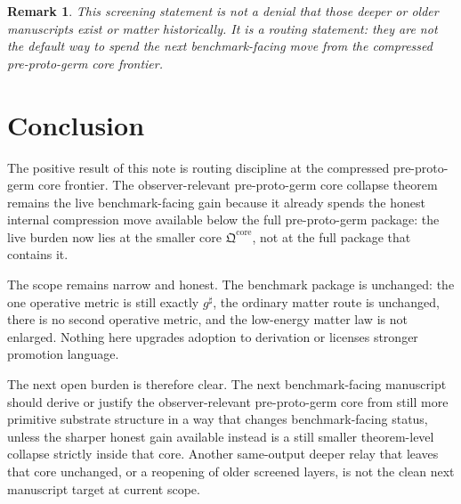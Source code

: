\documentclass[11pt]{article}
\newcommand{\CompletedMetric}{g^{\sharp}}
\newcommand{\PreProtoCore}{\mathfrak Q^{\mathrm{core}}}
\newtheorem{remark}{Remark}
\begin{document}
\begin{remark}
This screening statement is not a denial that those deeper or older manuscripts exist or matter historically. It is a routing statement: they are not the default way to spend the next benchmark-facing move from the compressed pre-proto-germ core frontier.
\end{remark}

\section{Conclusion}

The positive result of this note is routing discipline at the compressed pre-proto-germ core frontier. The observer-relevant pre-proto-germ core collapse theorem remains the live benchmark-facing gain because it already spends the honest internal compression move available below the full pre-proto-germ package: the live burden now lies at the smaller core \(\PreProtoCore\), not at the full package that contains it.

The scope remains narrow and honest. The benchmark package is unchanged: the one operative metric is still exactly \(\CompletedMetric\), the ordinary matter route is unchanged, there is no second operative metric, and the low-energy matter law is not enlarged. Nothing here upgrades adoption to derivation or licenses stronger promotion language.

The next open burden is therefore clear. The next benchmark-facing manuscript should derive or justify the observer-relevant pre-proto-germ core from still more primitive substrate structure in a way that changes benchmark-facing status, unless the sharper honest gain available instead is a still smaller theorem-level collapse strictly inside that core. Another same-output deeper relay that leaves that core unchanged, or a reopening of older screened layers, is not the clean next manuscript target at current scope.
\end{document}
